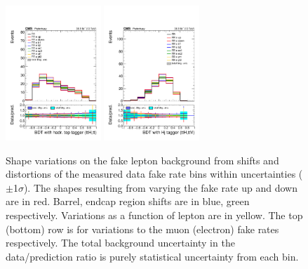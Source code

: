 \begin{figure}[htb]
        \includegraphics[width=0.32\textwidth]{ch10_figs/kinMVA_2lss_e_ttbar_withBDTv8.pdf}
        \includegraphics[width=0.32\textwidth]{ch10_figs/kinMVA_2lss_e_ttV_withHj.pdf}
        \caption[Variations in discriminant shape due to fake rate systematics]{Shape variations on the fake lepton background from shifts and distortions
          of the measured data fake rate bins within uncertainties ($\pm$1$\sigma$). 
          The shapes resulting from varying the fake rate up and down are in red. Barrel, endcap region shifts are in blue, green respectively. Variations as a function
          of lepton \pt are in yellow. The top (bottom) row is for variations to the muon (electron) fake rates respectively. The total background uncertainty in the
          data/prediction ratio is purely statistical uncertainty from each bin.}
        \label{fig:FRvars_shape}
\end{figure}

